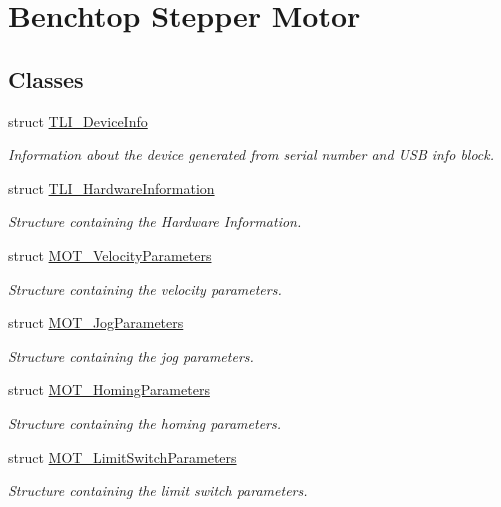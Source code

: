 \hypertarget{group___benchtop_stepper}{}\section{Benchtop Stepper Motor}
\label{group___benchtop_stepper}
\subsection*{Classes}
\begin{DoxyCompactItemize}
\item 
struct \hyperlink{struct_t_l_i___device_info}{T\+L\+I\+\_\+\+Device\+Info}
\begin{DoxyCompactList}\small\item\em Information about the device generated from serial number and U\+SB info block. \end{DoxyCompactList}\item 
struct \hyperlink{struct_t_l_i___hardware_information}{T\+L\+I\+\_\+\+Hardware\+Information}
\begin{DoxyCompactList}\small\item\em Structure containing the Hardware Information. \end{DoxyCompactList}\item 
struct \hyperlink{struct_m_o_t___velocity_parameters}{M\+O\+T\+\_\+\+Velocity\+Parameters}
\begin{DoxyCompactList}\small\item\em Structure containing the velocity parameters. \end{DoxyCompactList}\item 
struct \hyperlink{struct_m_o_t___jog_parameters}{M\+O\+T\+\_\+\+Jog\+Parameters}
\begin{DoxyCompactList}\small\item\em Structure containing the jog parameters. \end{DoxyCompactList}\item 
struct \hyperlink{struct_m_o_t___homing_parameters}{M\+O\+T\+\_\+\+Homing\+Parameters}
\begin{DoxyCompactList}\small\item\em Structure containing the homing parameters. \end{DoxyCompactList}\item 
struct \hyperlink{struct_m_o_t___limit_switch_parameters}{M\+O\+T\+\_\+\+Limit\+Switch\+Parameters}
\begin{DoxyCompactList}\small\item\em Structure containing the limit switch parameters. \end{DoxyCompactList}\item 

\end{DoxyCompactItemize}
